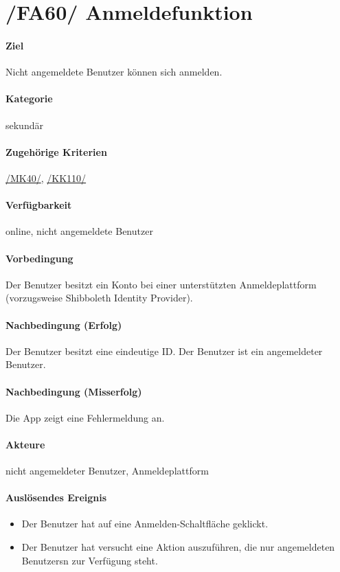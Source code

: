 \section[Anmeldefunktion]{/FA60/ Anmeldefunktion}
\label{/FA60/}
\paragraph{Ziel}
Nicht angemeldete \Gls{Benutzer} können sich anmelden.
\paragraph{Kategorie}
sekundär
\paragraph{Zugehörige Kriterien}
\hyperref[/MK40/]{/MK40/}, \hyperref[/KK110/]{/KK110/}
\paragraph{Verfügbarkeit}
online, nicht angemeldete Benutzer
\paragraph{Vorbedingung}
Der \Gls{Benutzer} besitzt ein Konto bei einer unterstützten Anmeldeplattform (vorzugsweise Shibboleth Identity Provider).
\paragraph{Nachbedingung (Erfolg)}
Der \Gls{Benutzer} besitzt eine eindeutige \Gls{ID}. Der \Gls{Benutzer} ist ein \dq angemeldeter \Gls{Benutzer}\dq{}.
\paragraph{Nachbedingung (Misserfolg)}
Die App zeigt eine Fehlermeldung an.
\paragraph{Akteure}
nicht angemeldeter \Gls{Benutzer}, Anmeldeplattform
\paragraph{Auslösendes Ereignis}
\begin{itemize}
      \item Der \Gls{Benutzer} hat auf eine \dq Anmelden\dq{}-Schaltfläche geklickt.
      \item Der \Gls{Benutzer} hat versucht eine Aktion auszuführen, die nur angemeldeten \Glspl{Benutzer}n zur Verfügung steht.
\end{itemize}
